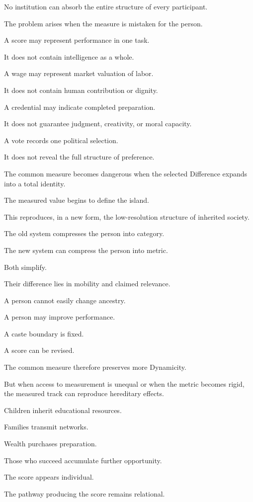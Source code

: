 No institution can absorb the entire structure of every participant.

The problem arises when the measure is mistaken for the person.

A score may represent performance in one task.

It does not contain intelligence as a whole.

A wage may represent market valuation of labor.

It does not contain human contribution or dignity.

A credential may indicate completed preparation.

It does not guarantee judgment, creativity, or moral capacity.

A vote records one political selection.

It does not reveal the full structure of preference.

The common measure becomes dangerous when the selected Difference expands into a total identity.

The measured value begins to define the island.

This reproduces, in a new form, the low-resolution structure of inherited society.

The old system compresses the person into category.

The new system can compress the person into metric.

Both simplify.

Their difference lies in mobility and claimed relevance.

A person cannot easily change ancestry.

A person may improve performance.

A caste boundary is fixed.

A score can be revised.

The common measure therefore preserves more Dynamicity.

But when access to measurement is unequal or when the metric becomes rigid, the measured track can reproduce hereditary effects.

Children inherit educational resources.

Families transmit networks.

Wealth purchases preparation.

Those who succeed accumulate further opportunity.

The score appears individual.

The pathway producing the score remains relational.

